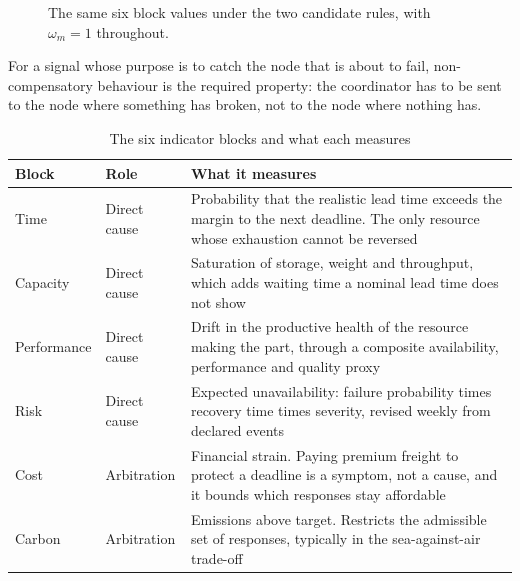 \begin{figure}[H]
\caption[Why the aggregation is an OR and not an average]{The same six block values under the
two candidate rules, with $\omega_m = 1$ throughout.}
\label{fig:ou}
\end{figure}

For a signal whose purpose is to catch the node that is about to fail, non-compensatory
behaviour is the required property: the coordinator has to be sent to the node where
something has broken, not to the node where nothing has.

\begin{table}[H]
\centering
\caption{The six indicator blocks and what each measures}
\label{tab:blocs}
\small
\begin{tabularx}{\linewidth}{>{\raggedright\arraybackslash}p{2.0cm} >{\raggedright\arraybackslash}p{2.7cm} X}
\toprule
\textbf{Block} & \textbf{Role} & \textbf{What it measures} \\
\midrule
Time & Direct cause & Probability that the realistic lead time exceeds the margin to the
next deadline. The only resource whose exhaustion cannot be reversed \\
Capacity & Direct cause & Saturation of storage, weight and throughput, which adds waiting
time a nominal lead time does not show \\
Performance & Direct cause & Drift in the productive health of the resource making the part,
through a composite availability, performance and quality proxy \\
Risk & Direct cause & Expected unavailability: failure probability times recovery time times
severity, revised weekly from declared events \\
Cost & Arbitration & Financial strain. Paying premium freight to protect a deadline is a
symptom, not a cause, and it bounds which responses stay affordable \\
Carbon & Arbitration & Emissions above target. Restricts the admissible set of responses,
typically in the sea-against-air trade-off \\
\bottomrule
\end{tabularx}
\end{table}


